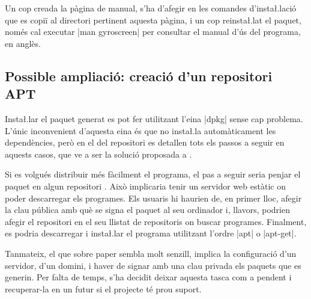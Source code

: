 Un cop creada la pàgina de manual, s'ha d'afegir en les comandes d'insta\l.lació
que es copiï al directori pertinent aquesta pàgina, i un cop reinsta\l.lat el
paquet, només cal executar \ord|man gyroscreen| per consultar el
manual d'ús del programa, en anglès.

\subsection{Possible ampliació: creació d'un repositori APT}

Insta\l.lar el paquet generat es pot fer utilitzant l'eina \ord|dpkg| sense cap
problema. L'únic inconvenient d'aquesta eina és que no insta\l.la automàticament
les dependències, però en el  del repositori es detallen tots els
passos a seguir en aquests casos, que ve a ser la solució proposada a
\cite{dpkgHelp}.

Si es volgués distribuir més fàcilment el programa, el pas a seguir seria
penjar el paquet en algun repositori . Això implicaria tenir un servidor
web estàtic on poder descarregar els programes. Els usuaris hi haurien de, en primer
lloc, afegir la clau pública amb què se signa el paquet al seu ordinador i,
llavors, podrien afegir el repositori  en el seu llistat de repositoris
on buscar programes. Finalment, es podria descarregar i insta\l.lar el programa
utilitzant l'ordre \ord|apt| o \ord|apt-get|.

Tanmateix, el que sobre paper sembla molt senzill, implica la configuració d'un
servidor, d'un domini, i haver de signar amb una clau privada els paquets que es
generin. Per falta de temps, s'ha decidit deixar aquesta tasca com a pendent i
recuperar-la en un futur si el projecte té prou suport.

